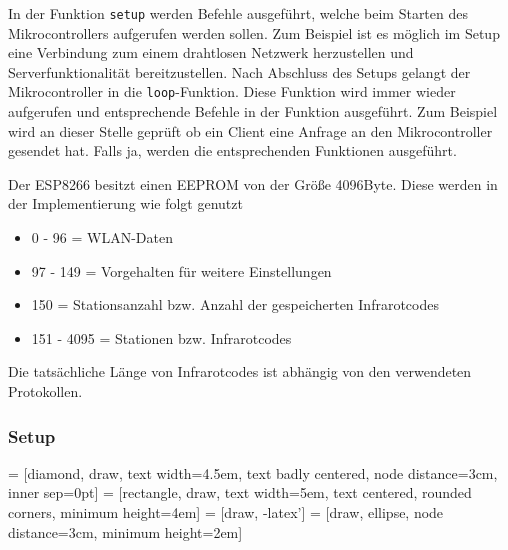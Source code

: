 In der Funktion \texttt{setup} werden Befehle ausgeführt, welche beim Starten des Mikrocontrollers aufgerufen werden sollen.
Zum Beispiel ist es möglich im Setup eine Verbindung zum einem drahtlosen Netzwerk herzustellen und Serverfunktionalität bereitzustellen.
Nach Abschluss des Setups gelangt der Mikrocontroller in die \texttt{loop}-Funktion.
Diese Funktion wird immer wieder aufgerufen und entsprechende Befehle in der Funktion ausgeführt.
Zum Beispiel wird an dieser Stelle geprüft ob ein Client eine Anfrage an den Mikrocontroller gesendet hat.
Falls ja, werden die entsprechenden Funktionen ausgeführt.

Der ESP8266 besitzt einen \acs{EEPROM} von der Größe 4096Byte.
Diese werden in der Implementierung wie folgt genutzt 
\begin{itemize}
	\item 0 - 96 = WLAN-Daten
	\item 97 - 149 = Vorgehalten für weitere Einstellungen
	\item 150 = Stationsanzahl bzw. Anzahl der gespeicherten Infrarotcodes
	\item 151 - 4095 = Stationen bzw. Infrarotcodes
\end{itemize}
Die tatsächliche Länge von Infrarotcodes ist abhängig von den verwendeten Protokollen.

\subsubsection{Setup}
 = [diamond, draw, 
    text width=4.5em, text badly centered, node distance=3cm, inner sep=0pt]
 = [rectangle, draw, 
    text width=5em, text centered, rounded corners, minimum height=4em]
 = [draw, -latex']
 = [draw, ellipse, node distance=3cm,
    minimum height=2em]

